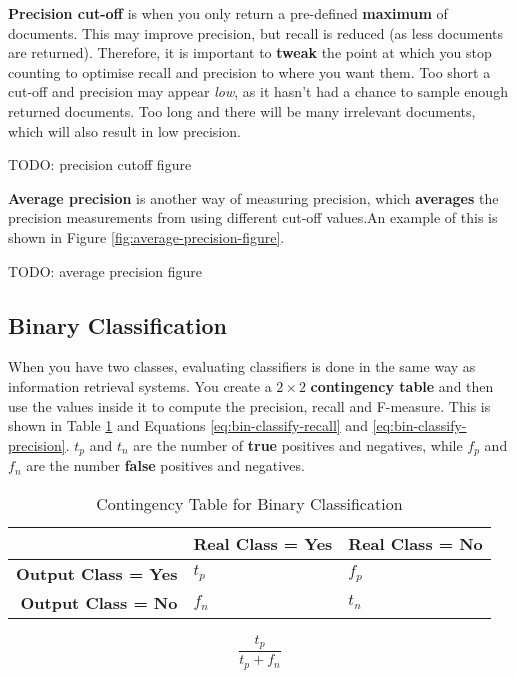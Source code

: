 \documentclass{article}
\begin{document}
\textbf{Precision cut-off} is when you only return a pre-defined \textbf{maximum} of documents. This may improve precision, but recall is reduced (as less documents are returned). Therefore, it is important to \textbf{tweak} the point at which you stop counting to optimise recall and precision to where you want them. Too short a cut-off and precision may appear \textit{low}, as it hasn't had a chance to sample enough returned documents. Too long and there will be many irrelevant documents, which will also result in low precision.

TODO: precision cutoff figure

\textbf{Average precision} is another way of measuring precision, which \textbf{averages} the precision measurements from using different cut-off values.An example of this is shown in Figure \ref{fig:average-precision-figure}.

TODO: average precision figure

\subsection{Binary Classification}

When you have two classes, evaluating classifiers is done in the same way as information retrieval systems. You create a $2 \times 2$ \textbf{contingency table} and then use the values inside it to compute the precision, recall and F-measure. This is shown in Table \ref{tab:bin-classify-example-contingency} and Equations \ref{eq:bin-classify-recall} and \ref{eq:bin-classify-precision}. $t_p$ and $t_n$ are the number of \textbf{true} positives and negatives, while $f_p$ and $f_n$ are the number \textbf{false} positives and negatives.

\begin{table}[H]
	\centering
	\begin{tabular}{|r|l|l|}
		\hline
		& \textbf{Real Class = Yes} & \textbf{Real Class = No} \\
		\hline
		\textbf{Output Class = Yes} & $t_p$ & $f_p$ \\
		\textbf{Output Class = No} & $f_n$ & $t_n$ \\
		\hline
	\end{tabular}
	\caption{Contingency Table for Binary Classification}
	\label{tab:bin-classify-example-contingency}
\end{table}

\begin{equation}
	\frac{t_p}{t_p + f_n}
	\label{eq:bin-classify-recall}
\end{equation}
\end{document}
